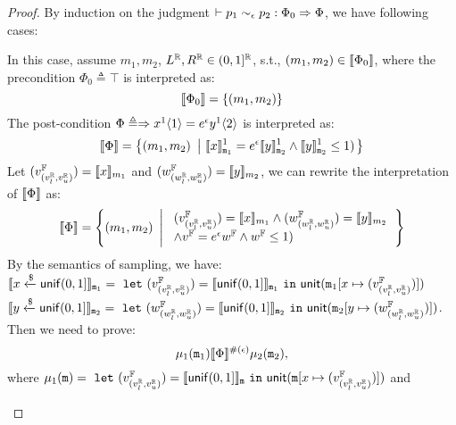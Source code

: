 \documentclass[a4paper,11pt]{article}
\begin{document}
\begin{proof}
By induction on the judgment $\vdash p_1	
\sim_{\epsilon}
p_2 :
\Phi_0 \Rightarrow \Phi $, we have following cases:
\begin{itemize}
\caseL{{\small\[
\inferrule
{
	\empty
}
{
	\vdash
	\varx \samplel \uniform(0, 1] 	
	\sim_{\epsilon} 
	\vary \samplel \uniform(0, 1]
	:
	\top
	\Rightarrow
	\varx^1 \langle 1 \rangle 
	= 
	e^{\epsilon} \vary^1 \langle 2 \rangle 	
}~\textbf{unif}
\]}}
	In this case, 
	assume $m_1, m_2$, $L^{\mathbb{R}}, R^{\mathbb{R}} \in (0,1]^{\mathbb{R}}$, s.t.,
	$(m_1, m_2) \in \llbracket \Phi_0 \rrbracket$, where the precondition
	$
	\Phi_0 \triangleq
	\top
	$
	is interpreted as:
	\[
	\llbracket \Phi_0 \rrbracket =
	\left \{
	(m_1, m_2)
	\right \}
	\]
	The post-condition $\Phi \triangleq 
			\Rightarrow
	x^1 \langle 1 \rangle 
	= 
	e^{\epsilon} y^1 \langle 2 \rangle 	
	$ is interpreted as:
	\[
	\llbracket \Phi \rrbracket =
	\left \{
	(m_1, m_2)
	~ \left \vert ~
	\llbracket x \rrbracket_{\mathtt{m}_1}^1 =
	e^{\epsilon} \llbracket y \rrbracket_{\mathtt{m}_2}^1
		\land \llbracket y \rrbracket_{\mathtt{m}_2}^1 \leq 1)
	\right.
	\right \}
	\]
	Let $(v^{\mathbb{F}}_{(v^{\mathbb{R}}_{l}, v^{\mathbb{R}}_{u})}) = \llbracket x \rrbracket_{m_1}$ and 
	$(w^{\mathbb{F}}_{(w^{\mathbb{R}}_{l}, w^{\mathbb{R}}_{u})}) = \llbracket y \rrbracket_{m_2}$, we can rewrite the interpretation of $\llbracket \Phi \rrbracket$ as:
\[
	\llbracket \Phi \rrbracket =
	\left \{
	(m_1, m_2)
	~ \left \vert ~
	\begin{array}{l}
	(v^{\mathbb{F}}_{(v^{\mathbb{R}}_{l}, v^{\mathbb{R}}_{u})}) = \llbracket x \rrbracket_{m_1}
	\land 
	(w^{\mathbb{F}}_{(w^{\mathbb{R}}_{l}, w^{\mathbb{R}}_{u})}) = \llbracket y \rrbracket_{m_2}
	\\
	\land
	v^{\mathbb{F}} = e^{\epsilon}  w^{\mathbb{F}}
		\land w^{\mathbb{F}} \leq 1)
	\end{array}
	\right.
	\right \}
\]
	By the semantics of sampling, we have:\\
	$\llbracket x \xleftarrow{\$} \mathsf{unif}(0, 1] \rrbracket_{\mathtt{m}_1} =
	~\mathtt{let}~ (v^{\mathbb{F}}_{(v^{\mathbb{R}}_{l}, v^{\mathbb{R}}_{u})}) 
	= \llbracket \mathsf{unif}(0, 1] \rrbracket_{\mathtt{m}_1} 
	~\mathtt{in}~ 
	\mathsf{unit}(\mathtt{m}_1[x \mapsto (v^{\mathbb{F}}_{(v^{\mathbb{R}}_{l}, v^{\mathbb{R}}_{u})})])
	$
	\\
	$\llbracket y \xleftarrow{\$} \mathsf{unif}(0, 1] \rrbracket_{\mathtt{m}_2} = 
	~\mathtt{let}~ (w^{\mathbb{F}}_{(w^{\mathbb{R}}_{l}, w^{\mathbb{R}}_{u})})
	= \llbracket \mathsf{unif}(0, 1] \rrbracket_{\mathtt{m}_2} 
	~\mathtt{in}~ 
	\mathsf{unit}(\mathtt{m}_2[y \mapsto (w^{\mathbb{F}}_{(w^{\mathbb{R}}_{l}, w^{\mathbb{R}}_{u})})])
	$. \\
	Then we need to prove:
	\[\mu_1(\mathtt{m}_1) \llbracket \Phi \rrbracket^{\#(\epsilon)} \mu_2(\mathtt{m}_2),\]
	where 
	$\mu_1(\mathtt{m}) = 
	~\mathtt{let}~ (v^{\mathbb{F}}_{(v^{\mathbb{R}}_{l}, v^{\mathbb{R}}_{u})}) 
	= \llbracket \mathsf{unif}(0, 1] \rrbracket_{\mathtt{m}} 
	~\mathtt{in}~ 
	\mathsf{unit}(\mathtt{m}[x \mapsto (v^{\mathbb{F}}_{(v^{\mathbb{R}}_{l}, v^{\mathbb{R}}_{u})})])$ and
	\\

\end{itemize}
\end{proof}
\end{document}
